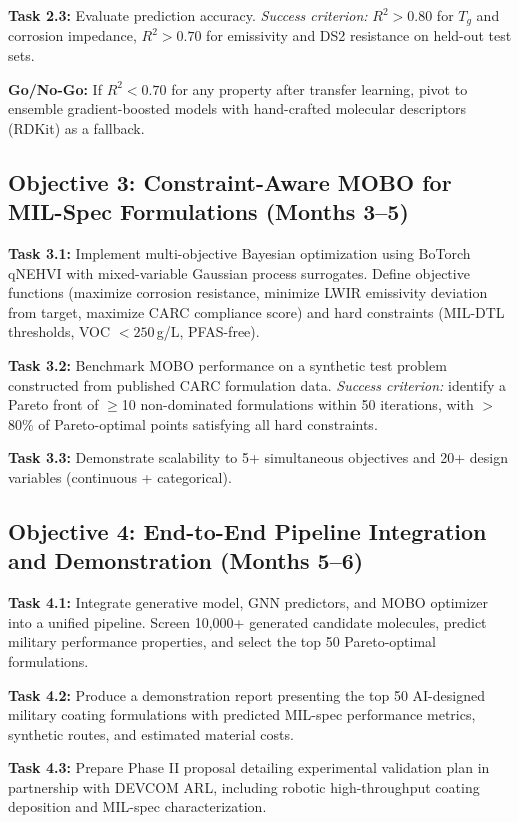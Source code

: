 \documentclass[11pt,letterpaper]{article}
\begin{document}
\textbf{Task 2.3:} Evaluate prediction accuracy. \textit{Success criterion:} $R^2 > 0.80$ for $T_g$ and corrosion impedance, $R^2 > 0.70$ for emissivity and DS2 resistance on held-out test sets.

\textbf{Go/No-Go:} If $R^2 < 0.70$ for any property after transfer learning, pivot to ensemble gradient-boosted models with hand-crafted molecular descriptors (RDKit) as a fallback.

\subsection{Objective 3: Constraint-Aware MOBO for MIL-Spec Formulations (Months 3--5)}

\textbf{Task 3.1:} Implement multi-objective Bayesian optimization using BoTorch qNEHVI with mixed-variable Gaussian process surrogates. Define objective functions (maximize corrosion resistance, minimize LWIR emissivity deviation from target, maximize CARC compliance score) and hard constraints (MIL-DTL thresholds, VOC $< 250$\,g/L, PFAS-free).

\textbf{Task 3.2:} Benchmark MOBO performance on a synthetic test problem constructed from published CARC formulation data. \textit{Success criterion:} identify a Pareto front of $\geq$10 non-dominated formulations within 50 iterations, with $>$80\% of Pareto-optimal points satisfying all hard constraints.

\textbf{Task 3.3:} Demonstrate scalability to 5+ simultaneous objectives and 20+ design variables (continuous + categorical).

\subsection{Objective 4: End-to-End Pipeline Integration and Demonstration (Months 5--6)}

\textbf{Task 4.1:} Integrate generative model, GNN predictors, and MOBO optimizer into a unified pipeline. Screen 10,000+ generated candidate molecules, predict military performance properties, and select the top 50 Pareto-optimal formulations.

\textbf{Task 4.2:} Produce a demonstration report presenting the top 50 AI-designed military coating formulations with predicted MIL-spec performance metrics, synthetic routes, and estimated material costs.

\textbf{Task 4.3:} Prepare Phase II proposal detailing experimental validation plan in partnership with DEVCOM ARL, including robotic high-throughput coating deposition and MIL-spec characterization.
\end{document}
